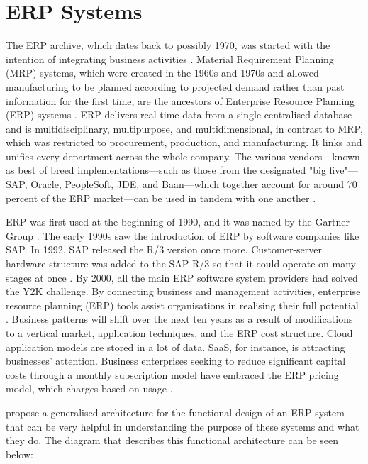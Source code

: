 \section{ERP Systems}
\par{The ERP archive, which dates back to possibly 1970, was started with the intention of integrating business activities \citep{shields2004business}. Material Requirement Planning (MRP) systems, which were created in the 1960s and 1970s and allowed manufacturing to be planned according to projected demand rather than past information for the first time, are the ancestors of Enterprise Resource Planning (ERP) systems \citep{ahlawat2017role}. ERP delivers real-time data from a single centralised database and is multidisciplinary, multipurpose, and multidimensional, in contrast to MRP, which was restricted to procurement, production, and manufacturing. It links and unifies every department across the whole company. The various vendors—known as best of breed implementations—such as those from the designated "big five"—SAP, Oracle, PeopleSoft, JDE, and Baan—which together account for around 70 percent of the ERP market—can be used in tandem with one another \citep{light2001erp}. 

ERP was first used at the beginning of 1990, and it was named by the Gartner Group \citep{chang2000delphi}. The early 1990s saw the introduction of ERP by software companies like SAP. In 1992, SAP released the R/3 version once more. Customer-server hardware structure was added to the SAP R/3 so that it could operate on many stages at once \citep{jacobs2007enterprise}. By 2000, all the main ERP software system providers had solved the Y2K challenge. By connecting business and management activities, enterprise resource planning (ERP) tools assist organisations in realising their full potential \citep{uccakturk2013effects}. Business patterns will shift over the next ten years as a result of modifications to a vertical market, application techniques, and the ERP cost structure. Cloud application models are stored in a lot of data. SaaS, for instance, is attracting businesses' attention. Business enterprises seeking to reduce significant capital costs through a monthly subscription model have embraced the ERP pricing model, which charges based on usage \citep{kenge2020research}.

\cite{zhao2021research} propose a generalised architecture for the functional design of an ERP system that can be very helpful in understanding the purpose of these systems and what they do. The diagram that describes this functional architecture can be seen below:}

